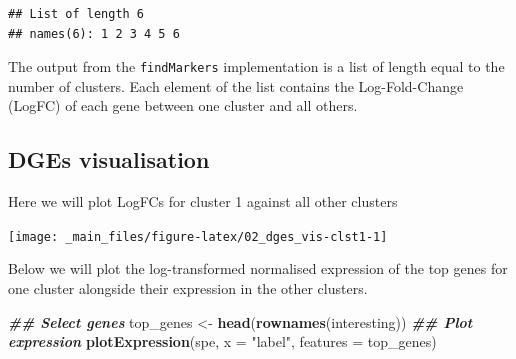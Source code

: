 \documentclass[
]{book}
\newenvironment{Shaded}{\begin{snugshade}}{\end{snugshade}}
\newcommand{\AttributeTok}[1]{\textcolor[rgb]{0.13,0.29,0.53}{#1}}
\newcommand{\DecValTok}[1]{\textcolor[rgb]{0.00,0.00,0.81}{#1}}
\newcommand{\DocumentationTok}[1]{\textcolor[rgb]{0.56,0.35,0.01}{\textbf{\textit{#1}}}}
\newcommand{\FunctionTok}[1]{\textcolor[rgb]{0.13,0.29,0.53}{\textbf{#1}}}
\newcommand{\NormalTok}[1]{#1}
\newcommand{\OtherTok}[1]{\textcolor[rgb]{0.56,0.35,0.01}{#1}}
\newcommand{\SpecialCharTok}[1]{\textcolor[rgb]{0.81,0.36,0.00}{\textbf{#1}}}
\newcommand{\StringTok}[1]{\textcolor[rgb]{0.31,0.60,0.02}{#1}}
\begin{document}
\begin{verbatim}
## List of length 6
## names(6): 1 2 3 4 5 6
\end{verbatim}

The output from the \texttt{findMarkers} implementation is a list of length equal to the number of clusters. Each element of the list contains the Log-Fold-Change (LogFC) of each gene between one cluster and all others.

\hypertarget{dges-visualisation}{%
\subsection{DGEs visualisation}\label{dges-visualisation}}

Here we will plot LogFCs for cluster 1 against all other clusters

\begin{Shaded}
\end{Shaded}

\texttt{[image: \_main\_files/figure-latex/02\_dges\_vis-clst1-1]}

Below we will plot the log-transformed normalised expression of the top genes for one cluster alongside their expression in the other clusters.

\begin{Shaded}
\begin{Highlighting}[]
\DocumentationTok{\#\# Select genes}
\NormalTok{top\_genes }\OtherTok{\textless{}{-}} \FunctionTok{head}\NormalTok{(}\FunctionTok{rownames}\NormalTok{(interesting))}
\DocumentationTok{\#\# Plot expression}
\FunctionTok{plotExpression}\NormalTok{(spe, }\AttributeTok{x =} \StringTok{"label"}\NormalTok{, }\AttributeTok{features =}\NormalTok{ top\_genes)}
\end{Highlighting}
\end{Shaded}
\end{document}

